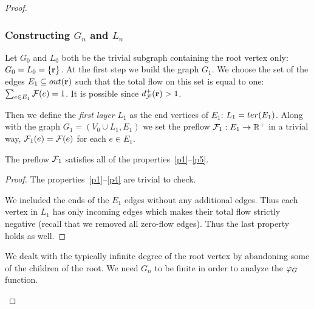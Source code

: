 \documentclass[12pt]{amsart}
\begin{document}
\begin{proof}
      \subsubsection*{Constructing $G_n$ and $L_n$}
        Let $G_0$ and $L_0$ both be the trivial subgraph containing the root vertex only: $G_0 = L_0 = \left\{\mathbf{r}\right\}$.
        At the first step we build the graph $G_1$.
        We choose the set of the edges $E_1 \subseteq out(\mathbf{r})$ such that the total flow on this set is equal to one: $\sum_{e \in E_1} \mathcal{F}(e) = 1$.
        It is possible since $d^{+}_{\mathcal{F}}(\mathbf{r}) > 1$.

        Then we define the \emph{first layer} $L_1$ as the end vertices of $E_1$: $L_1 = ter(E_1)$.
        Along with the graph $G_1 = (V_0 \cup L_1, E_1)$ we set the preflow $\mathcal{F}_{1}: E_1 \to \mathbb{R}^{+}$ in a trivial way,
          $\mathcal{F}_{1}(e) = \mathcal{F}(e)$ for each $e \in E_1$.
        \begin{prop}
          The preflow $\mathcal{F}_{1}$ satisfies all of the properties~\ref{p1}--\ref{p5}.
        \end{prop}
        \begin{proof}
          The properties~\ref{p1}--\ref{p4} are trivial to check.

          We included the ends of the $E_1$ edges without any additional edges.
          Thus each vertex in $L_1$ has only incoming edges which makes their
            total flow strictly negative (recall that we removed all zero-flow edges).
          Thus the last property holds as well.
        \end{proof}
        \begin{remark}
          We dealt with the typically infinite degree of the root vertex by abandoning some of the children of the root.
          We need $G_n$ to be finite in order to analyze the $\varphi_{G}$ function.
        \end{remark}


\end{proof}
\end{document}
